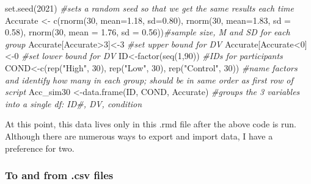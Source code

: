\documentclass[
  english,
]{book}
\newenvironment{Shaded}{\begin{snugshade}}{\end{snugshade}}
\newcommand{\AttributeTok}[1]{\textcolor[rgb]{0.77,0.63,0.00}{#1}}
\newcommand{\CommentTok}[1]{\textcolor[rgb]{0.56,0.35,0.01}{\textit{#1}}}
\newcommand{\DecValTok}[1]{\textcolor[rgb]{0.00,0.00,0.81}{#1}}
\newcommand{\FloatTok}[1]{\textcolor[rgb]{0.00,0.00,0.81}{#1}}
\newcommand{\FunctionTok}[1]{\textcolor[rgb]{0.00,0.00,0.00}{#1}}
\newcommand{\NormalTok}[1]{#1}
\newcommand{\OtherTok}[1]{\textcolor[rgb]{0.56,0.35,0.01}{#1}}
\newcommand{\SpecialCharTok}[1]{\textcolor[rgb]{0.00,0.00,0.00}{#1}}
\newcommand{\StringTok}[1]{\textcolor[rgb]{0.31,0.60,0.02}{#1}}
\begin{document}
\begin{Shaded}
\begin{Highlighting}[]
\FunctionTok{set.seed}\NormalTok{(}\DecValTok{2021}\NormalTok{) }\CommentTok{\#sets a random seed so that we get the same results each time}
\NormalTok{Accurate }\OtherTok{\textless{}{-}} \FunctionTok{c}\NormalTok{(}\FunctionTok{rnorm}\NormalTok{(}\DecValTok{30}\NormalTok{, }\AttributeTok{mean=}\FloatTok{1.18}\NormalTok{, }\AttributeTok{sd=}\FloatTok{0.80}\NormalTok{), }\FunctionTok{rnorm}\NormalTok{(}\DecValTok{30}\NormalTok{, }\AttributeTok{mean=}\FloatTok{1.83}\NormalTok{, }\AttributeTok{sd =} \FloatTok{0.58}\NormalTok{), }\FunctionTok{rnorm}\NormalTok{(}\DecValTok{30}\NormalTok{, }\AttributeTok{mean =} \FloatTok{1.76}\NormalTok{, }\AttributeTok{sd =} \FloatTok{0.56}\NormalTok{))}\CommentTok{\#sample size, M and SD for each group}
\NormalTok{Accurate[Accurate}\SpecialCharTok{\textgreater{}}\DecValTok{3}\NormalTok{]}\OtherTok{\textless{}{-}}\DecValTok{3} \CommentTok{\#set upper bound for DV}
\NormalTok{Accurate[Accurate}\SpecialCharTok{\textless{}}\DecValTok{0}\NormalTok{]}\OtherTok{\textless{}{-}}\DecValTok{0} \CommentTok{\#set lower bound for DV}
\NormalTok{ID}\OtherTok{\textless{}{-}}\FunctionTok{factor}\NormalTok{(}\FunctionTok{seq}\NormalTok{(}\DecValTok{1}\NormalTok{,}\DecValTok{90}\NormalTok{)) }\CommentTok{\#IDs for participants}
\NormalTok{COND}\OtherTok{\textless{}{-}}\FunctionTok{c}\NormalTok{(}\FunctionTok{rep}\NormalTok{(}\StringTok{"High"}\NormalTok{, }\DecValTok{30}\NormalTok{), }\FunctionTok{rep}\NormalTok{(}\StringTok{"Low"}\NormalTok{, }\DecValTok{30}\NormalTok{), }\FunctionTok{rep}\NormalTok{(}\StringTok{"Control"}\NormalTok{, }\DecValTok{30}\NormalTok{)) }\CommentTok{\#name factors and identify how many in each group; should be in same order as first row of script}
\NormalTok{Acc\_sim30 }\OtherTok{\textless{}{-}}\FunctionTok{data.frame}\NormalTok{(ID, COND, Accurate) }\CommentTok{\#groups the 3 variables into a single df:  ID\#, DV, condition}
\end{Highlighting}
\end{Shaded}

At this point, this data lives only in this .rmd file after the above code is run. Although there are numerous ways to export and import data, I have a preference for two.

\hypertarget{to-and-from-.csv-files}{%
\subsubsection{To and from .csv files}\label{to-and-from-.csv-files}}
\end{document}
